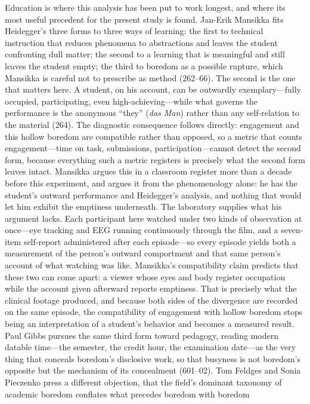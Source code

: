 Education is where this analysis has been put to work longest, and where its most useful
precedent for the present study is found. Jan-Erik Mansikka fits Heidegger's three forms to
three ways of learning: the first to technical instruction that reduces phenomena to
abstractions and leaves the student confronting dull matter; the second to a learning that is
meaningful and still leaves the student empty; the third to boredom as a possible rupture,
which Mansikka is careful not to prescribe as method (262--66). The second is the one that
matters here. A student, on his account, can be outwardly exemplary---fully occupied,
participating, even high-achieving---while what governs the performance is the anonymous
``they'' (\textit{das Man}) rather than any self-relation to the material (264). The
diagnostic consequence follows directly: engagement and this hollow boredom are compatible
rather than opposed, so a metric that counts engagement---time on task, submissions,
participation---cannot detect the second form, because everything such a metric registers is
precisely what the second form leaves intact. Mansikka argues this in a classroom register
more than a decade before this experiment, and argues it from the phenomenology alone: he has
the student's outward performance and Heidegger's analysis, and nothing that would let him
exhibit the emptiness underneath. The laboratory supplies what his argument lacks. Each
participant here watched under two kinds of observation at once---eye tracking and EEG running
continuously through the film, and a seven-item self-report administered after each
episode---so every episode yields both a measurement of the person's outward comportment and
that same person's account of what watching was like. Mansikka's compatibility claim predicts
that these two can come apart: a viewer whose eyes and body register occupation while the
account given afterward reports emptiness. That is precisely what the clinical footage
produced, and because both sides of the divergence are recorded on the same episode, the
compatibility of engagement with hollow boredom stops being an interpretation of a student's
behavior and becomes a measured result. Paul Gibbs pursues the same third form toward pedagogy, reading modern datable time---the
semester, the credit hour, the examination date---as the very thing that conceals boredom's
disclosive work, so that busyness is not boredom's opposite but the mechanism of its
concealment (601--02). Tom Feldges and Sonia Pieczenko press a different objection, that the
field's dominant taxonomy of academic boredom conflates what precedes boredom with boredom
